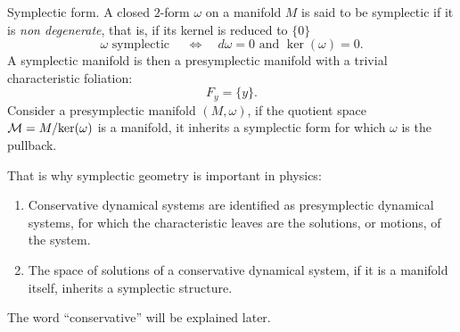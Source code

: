 \begin{Article}{Symplectic form.}{}
  A closed $2$-form $\omega$ on a manifold $M$ is said to be symplectic if it is \emph{non degenerate},
  that is,
  if its kernel is reduced to $\{0\}$
  $$%
    \omega \text{ symplectic }
    \quad \Leftrightarrow \quad
    d\omega = 0  \text{ and } \ker(\omega) = 0.
    $$%
  A symplectic manifold is then a presymplectic manifold with a trivial characteristic foliation:
  $$%
    F_y = \{y\}.
    $$%
   Consider a presymplectic manifold $(M,\omega)$,
  if the quotient space $\mathcal{M} = M / \mathrm{ker}(\omega)$ is a manifold,
  it inherits a symplectic form for which $\omega$ is the pullback.
  
  That is why symplectic geometry is important in physics:
  
  \begin{enumerate}
    \item Conservative dynamical systems are identified as presymplectic dynamical systems,
    for which the characteristic leaves are the solutions,
    or motions,
    of the system.
    \item The space of solutions of a conservative dynamical system,
    if it is a manifold itself,
    inherits a symplectic structure.
  \end{enumerate}
  
  The word ``conservative'' will be explained later.
\end{Article}


